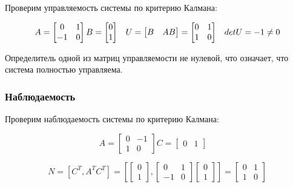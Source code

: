 Проверим управляемость системы по критерию Калмана:

\begin{equation*}
\text{$A=\begin{bmatrix}
0 & 1 \\ -1 & 0
\end{bmatrix} B=\begin{bmatrix}
0 \\ 1
\end{bmatrix}$} \quad
\text{$
U = \begin{bmatrix}
B & AB
\end{bmatrix} = \begin{bmatrix}
0 & 1\\ 1 & 0
\end{bmatrix} 
$} \quad
\text{$detU=-1\neq 0$}
\end{equation*}

Определитель одной из матриц управляемости не нулевой, что означает, что система полностью управляема.

\subsubsection{Наблюдаемость}

Проверим наблюдаемость системы по критерию Калмана:

\begin{equation*}
\text{$A=\begin{bmatrix}
0 & -1 \\ 1 & 0
\end{bmatrix} C=\begin{bmatrix}
0 & 1
\end{bmatrix}$} \quad
\end{equation*}

\begin{equation*}
\text{$N=[C^T,A^TC^T]=[\begin{bmatrix} 0 \\ 1 \end{bmatrix},\begin{bmatrix}   0  &  1 \\
   -1 &  0 \end{bmatrix}\begin{bmatrix} 0 \\ 1 \end{bmatrix}]=\begin{bmatrix} 0 & 1 \\ 1 & 0 \end{bmatrix}$}
\end{equation*}

